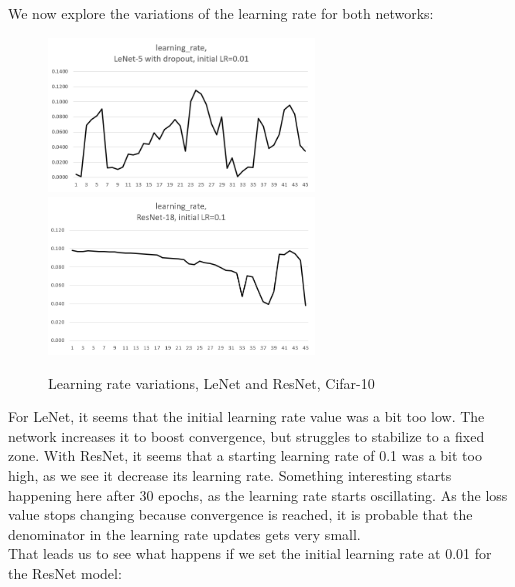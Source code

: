 \documentclass{article}
\begin{document}
  We now explore the variations of the learning rate for both networks:
  
  \begin{figure}[!h]
	\includegraphics[width=200pt]{lr_lenet_d_0_01.png}
	\includegraphics[width=200pt]{lr_resnet_0_1.png}
	\caption{Learning rate variations, LeNet and ResNet, Cifar-10}
\end{figure}
  
  For LeNet, it seems that the initial learning rate value was a bit too low. The network increases it to boost convergence, but struggles to stabilize to a fixed zone. With ResNet, it seems that a starting learning rate of 0.1 was a bit too high, as we see it decrease its learning rate. Something interesting starts happening here after 30 epochs, as the learning rate starts oscillating. As the loss value stops changing because convergence is reached, it is probable that the denominator in the learning rate updates gets very small.\\
  
  That leads us to see what happens if we set the initial learning rate at 0.01 for the ResNet model:\\
  
\end{document}
